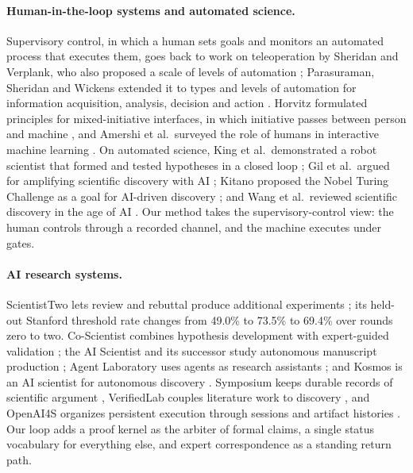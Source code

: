 \documentclass[11pt]{article}
\begin{document}
\paragraph{Human-in-the-loop systems and automated science.} Supervisory
control, in which a human sets goals and monitors an automated process that
executes them, goes back to work on teleoperation by Sheridan and Verplank,
who also proposed a scale of levels of automation \citep{sheridan};
Parasuraman, Sheridan and Wickens extended it to types and levels of
automation for information acquisition, analysis, decision and action
\citep{parasuraman}. Horvitz formulated principles for mixed-initiative
interfaces, in which initiative passes between person and machine
\citep{horvitz}, and Amershi et al.\ surveyed the role of humans in
interactive machine learning \citep{amershi}. On automated science, King et
al.\ demonstrated a robot scientist that formed and tested hypotheses in a
closed loop \citep{king}; Gil et al.\ argued for amplifying scientific
discovery with AI \citep{gil}; Kitano proposed the Nobel Turing Challenge as a goal
for AI-driven discovery \citep{kitano}; and Wang et al.\ reviewed scientific discovery in the age of
AI \citep{wangsci}. Our method takes the supervisory-control view: the human
controls through a recorded channel, and the machine executes under gates.

\paragraph{AI research systems.} ScientistTwo lets review and rebuttal produce
additional experiments \citep{scientisttwo}; its held-out Stanford threshold
rate changes from 49.0\% to 73.5\% to 69.4\% over rounds zero to two.
Co-Scientist combines hypothesis development with expert-guided validation
\citep{coscientist}; the AI Scientist and its successor study autonomous
manuscript production \citep{aiscientist,scientistv2}; Agent Laboratory uses
agents as research assistants \citep{agentlab}; and Kosmos is an AI
scientist for autonomous discovery \citep{kosmos}. Symposium keeps durable
records of scientific argument \citep{symposium}, VerifiedLab couples
literature work to discovery \citep[Figure 2]{verifiedlab}, and OpenAI4S
organizes persistent execution through sessions and artifact histories
\citep{openai4s}. Our loop adds a proof kernel as the arbiter of formal
claims, a single status vocabulary for everything else, and expert
correspondence as a standing return path.
\end{document}
